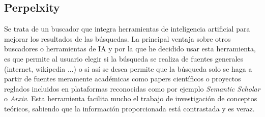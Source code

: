 \subsection{Perpelxity}
Se trata de un buscador que integra herramientas de inteligencia artificial para mejorar los resultados de las búsquedas\cite{PerplexityAI2025}. La principal ventaja sobre otros buscadores o herramientas de IA y por la que he decidido usar esta herramienta, es que permite al usuario elegir si la búsqueda se realiza de fuentes generales (internet, wikipedia ...) o si así se desea permite que la búsqueda solo se haga a partir de fuentes meramente académicas como papers científicos o proyectos reglados incluidos en plataformas reconocidas como por ejemplo \textit{Semantic Scholar}\cite{SemanticScholar} o \textit{Arxiv}\cite{arXiv}. Esta herramienta facilita mucho el trabajo de investigación de conceptos teóricos, sabiendo que la información proporcionada está contrastada y es veraz.









